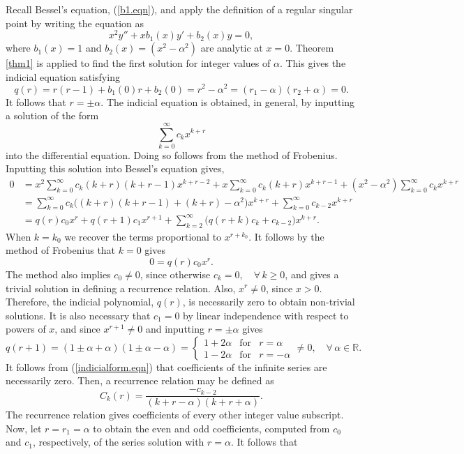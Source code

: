 \documentclass[12pt]{article}
\theoremstyle{definition}
\numberwithin{equation}{section}
\begin{document}
{Recall Bessel's equation, (\ref{b1.eqn}), and apply the definition of a regular singular point by writing the equation as
$$x^2y''+xb_1(x)y'+b_2(x)y=0,$$
where $b_1(x)=1$ and $b_2(x)=(x^2-\alpha^2)$ are analytic at $x=0$. Theorem \ref{thm1} is applied to find the first solution for integer values of $\alpha$. This gives the indicial equation satisfying
$$q(r)=r(r-1)+b_1(0)r+b_2(0)=r^2-\alpha^2=(r_1-\alpha)(r_2+\alpha)=0.$$
It follows that $r=\pm\alpha$. The indicial equation is obtained, in general, by inputting a solution of the form
$$\sum_{k=0}^\infty c_kx^{k+r}$$ into the differential equation. Doing so follows from the method of Frobenius. Inputting this solution into Bessel's equation gives,
\begin{align}
0&=x^2\sum_{k=0}^\infty c_k(k+r)(k+r-1)x^{k+r-2}+x\sum_{k=0}^\infty c_k(k+r)x^{k+r-1}+(x^2-\alpha^2)\sum_{k=0}^\infty c_kx^{k+r}\nonumber\\
&=\sum_{k=0}^\infty c_k\Big((k+r)(k+r-1)+(k+r)-\alpha^2\Big)x^{k+r}+\sum_{k=0}^\infty c_{k-2}x^{k+r}\nonumber\\
&=q(r)c_0x^r+q(r+1)c_1x^{r+1}+\sum_{k=2}^\infty\Big(q(r+k)c_k+c_{k-2}\Big)x^{k+r}.
\label{indicialform.eqn}
\end{align}
When $k=k_0$ we recover the terms proportional to $x^{r+k_0}$. It follows by the method of Frobenius that $k=0$ gives
$$0=q(r)c_0x^r.$$
The method also implies $c_0\neq 0$, since otherwise $c_k=0,\quad\forall\,k\geq 0$, and gives a trivial solution in defining a recurrence relation. Also, $x^r\neq 0$, since $x>0$. Therefore, the indicial polynomial, $q(r)$, is necessarily zero to obtain non-trivial solutions. It is also necessary that $c_1=0$ by linear independence with respect to powers of $x$, and since $x^{r+1}\neq 0$ and inputting $r=\pm\alpha$ gives
$$q(r+1)=(1\pm\alpha+\alpha)(1\pm\alpha-\alpha)=\left\{ \begin{array}{rcl}
1+2\alpha & \mbox{for}&r=\alpha\\
1-2\alpha & \mbox{for}&r=-\alpha
\end{array}\right.\neq 0,\quad\forall\,\alpha\in\mathbb{R}.$$
It follows from (\ref{indicialform.eqn}) that coefficients of the infinite series are necessarily zero. Then, a recurrence relation may be defined as
\begin{equation}
C_k(r)=\frac{-c_{k-2}}{(k+r-\alpha)(k+r+\alpha)}.
\label{ck.eqn}
\end{equation}
The recurrence relation gives coefficients of every other integer value subscript. Now, let $r=r_1=\alpha$ to obtain the even and odd coefficients, computed from $c_0$ and $c_1$, respectively, of the series solution with $r=\alpha$. It follows that
}
\end{document}
